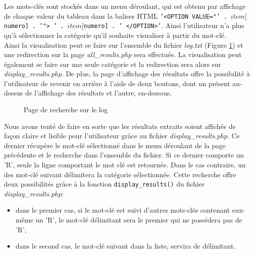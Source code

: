Les mots-clés sont stockés dans un menu déroulant, qui est obtenu par affichage de chaque valeur du tableau dans la balises HTML \texttt{'<OPTION VALUE="' . $item[$numero] . '"> ' . $item[$numero] . ' </OPTION>'}. Ainsi l'utilisateur n'a plus qu'à sélectionner la catégorie qu'il souhaite visualiser à partir du mot-clé. \\

Ainsi la visualisation peut se faire sur l'ensemble du fichier \emph{log.txt} (Figure \ref{affichageResultats}) et une redirection sur la page  \emph{all\_results.php} sera effectuée. La visualisation peut également se faire sur une seule catégorie et la redirection sera alors sur \emph{display\_results.php}. De plus, la page d'affichage des résultats offre la possibilité à l'utilisateur de revenir en arrière à l'aide de deux boutons, dont un présent au-dessus de l'affichage des résultats et l'autre, en-dessous.\\

\begin{figure}[!ht]
	\begin{center}
		\caption{Page de recherche sur le log}
  		\label{affichageResultats}
  	\end{center}	
\end{figure}

Nous avons tenté de faire en sorte que les résultats extraits soient affichés de façon claire et lisible pour l'utilisateur grâce au fichier \emph{display\_results.php}. Ce dernier récupère le mot-clé sélectionné dans le menu déroulant de la page précédente et le recherche dans l'ensemble du fichier. Si ce dernier comporte un 'R', seule la ligne comportant le mot clé est retournée. Dans le cas contraire, un des mot-clé suivant délimitera la catégorie sélectionnée. Cette recherche offre deux possibilités grâce à la fonction \texttt{display\_results()} du fichier \emph{display\_results.php}:
\begin{itemize}
\item dans le premier cas, si le mot-clé est suivi d'autres mots-clés contenant eux-même un 'R', le mot-clé délimitant sera le premier qui ne possédera pas de 'R',
\item dans le second cas, le mot-clé suivant dans la liste, servira de délimitant.
\end{itemize}


